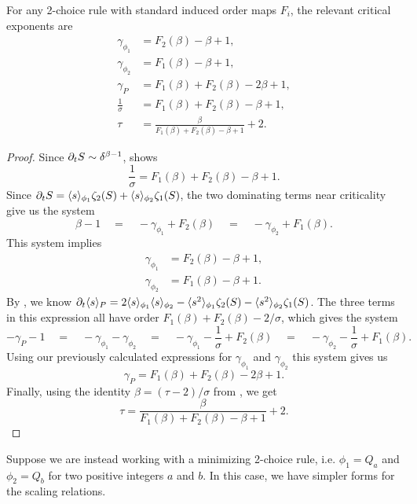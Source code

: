 \documentclass[twoside,10pt]{article}
\begin{document}
\begin{thrm}[]
	\label{2c-scaling-relations}
	For any 2-choice rule with standard induced order maps $F_{i}$, the relevant critical exponents are
	\begin{align*}
		\gamma_{\phi_1} &= F_2(\beta) - \beta + 1,\\
		\gamma_{\phi_2} &= F_1(\beta) - \beta + 1,\\
		\gamma_{P} &= F_1(\beta)+F_2(\beta) - 2\beta + 1,\\
		\frac{1}{\sigma} &= F_1(\beta) + F_2(\beta) - \beta + 1,\\
		\tau &= \frac{\beta}{F_1(\beta)+F_2(\beta)-\beta+1} +2.
	\end{align*}
\end{thrm}
\begin{proof}
	Since $\partial_{t}{S} \sim \delta^{\beta-1}$,  shows
\[
	\frac{1}{\sigma} = F_1(\beta) + F_2(\beta) - \beta + 1.
\]
	Since $\partial_{t}{S} = \langle s \rangle_{\phi_1}\zeta_2(S) + \langle s \rangle_{\phi_2}\zeta_1(S)$, the two dominating terms near criticality give us the system
\[
        \beta -1 \quad=\quad -\gamma_{\phi_1} + F_2(\beta) \quad=\quad -\gamma_{\phi_2} + F_1(\beta).
\]
This system implies
\begin{align*}
        \gamma_{\phi_1} &= F_2(\beta) - \beta + 1,\\
        \gamma_{\phi_2} &= F_1(\beta) - \beta + 1.
\end{align*}
By , we know $\partial_{t}{\langle s \rangle_{P}} = 2\langle s \rangle_{\phi_1}\langle s \rangle_{\phi_2} - \langle s^2 \rangle_{\phi_1}\zeta_2(S) - \langle s^2 \rangle_{\phi_2}\zeta_1(S)$. The three terms in this expression all have order $F_1(\beta)+F_2(\beta) - 2/\sigma$, which gives the system
\[
        -\gamma_{P}-1 \quad=\quad -\gamma_{\phi_1}-\gamma_{\phi_2} \quad=\quad -\gamma_{\phi_1}-\frac{1}{\sigma} +F_2(\beta) \quad=\quad -\gamma_{\phi_2}-\frac{1}{\sigma} + F_1(\beta).
\]
Using our previously calculated expressions for $\gamma_{\phi_1}$ and $\gamma_{\phi_2}$ this system gives us
\[
        \gamma_{P} = F_1(\beta)+F_2(\beta) - 2\beta + 1.
\]
Finally, using the identity $\beta = (\tau-2)/\sigma$ from , we get
\[
        \tau = \frac{\beta}{F_1(\beta)+F_2(\beta)-\beta+1} +2.
\]
\end{proof}

Suppose we are instead working with a minimizing 2-choice rule, i.e. $\phi_1=Q_{a}$ and $\phi_2=Q_{b}$ for two positive integers $a$ and $b$. In this case, we have simpler forms for the scaling relations.
\end{document}
